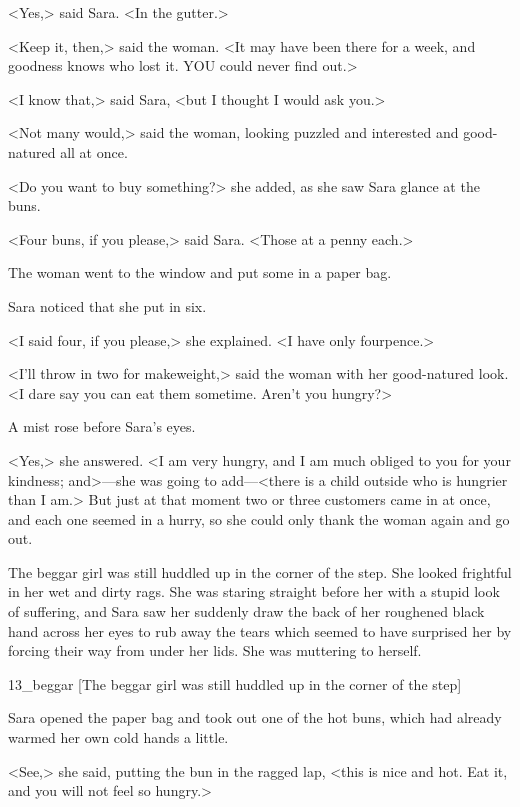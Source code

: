 <Yes,> said Sara. <In the gutter.>

<Keep it, then,> said the woman. <It may have been there for a week, and goodness knows who lost it. YOU could never find out.>

<I know that,> said Sara, <but I thought I would ask you.>

<Not many would,> said the woman, looking puzzled and interested and good-natured all at once.

<Do you want to buy something?> she added, as she saw Sara glance at the buns.

<Four buns, if you please,> said Sara. <Those at a penny each.>

The woman went to the window and put some in a paper bag.

Sara noticed that she put in six.

<I said four, if you please,> she explained. <I have only fourpence.>

<I'll throw in two for makeweight,> said the woman with her good-natured look. <I dare say you can eat them sometime. Aren't you hungry?>

A mist rose before Sara's eyes.

<Yes,> she answered. <I am very hungry, and I am much obliged to you for your kindness; and>—she was going to add—<there is a child outside who is hungrier than I am.> But just at that moment two or three customers came in at once, and each one seemed in a hurry, so she could only thank the woman again and go out.

The beggar girl was still huddled up in the corner of the step. She looked frightful in her wet and dirty rags. She was staring straight before her with a stupid look of suffering, and Sara saw her suddenly draw the back of her roughened black hand across her eyes to rub away the tears which seemed to have surprised her by forcing their way from under her lids. She was muttering to herself.

\begin{colorbigpic}
	[\basicscale]
	{13_beggar}
	[The beggar girl was still huddled up in the corner of the step]
\end{colorbigpic}

Sara opened the paper bag and took out one of the hot buns, which had already warmed her own cold hands a little.

<See,> she said, putting the bun in the ragged lap, <this is nice and hot. Eat it, and you will not feel so hungry.>

